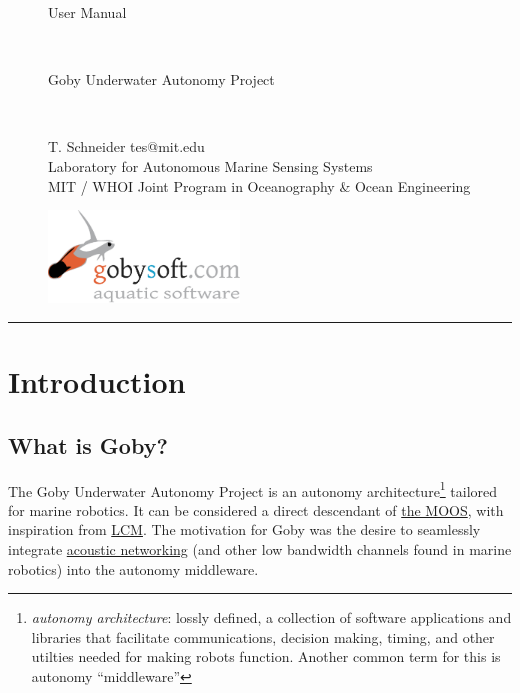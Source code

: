 \documentclass[11pt, letterpaper]{article}
\begin{document}
\begin{figure}[H]
\begin{minipage}[b]{0.55\linewidth}
\begin{LARGE}
User Manual
\end{LARGE}
\vspace{0.5em}\\
\begin{Large}
Goby Underwater Autonomy Project
\end{Large}
\vspace{0.5em}\\
\begin{footnotesize}
T. Schneider tes@mit.edu \\
Laboratory for Autonomous Marine Sensing Systems \\
MIT / WHOI Joint Program in Oceanography \& Ocean Engineering
\end{footnotesize}
\end{minipage}
\hfill
\begin{minipage}[b]{0.3\linewidth}
\begin{flushright}
\includegraphics[width=2in]{gobysoft_logo} 
\end{flushright}
\end{minipage}
\end{figure}

\vspace{0.5em}
\rule{\textwidth}{1pt}
\vspace{0.5em}

\tableofcontents

\section{Introduction}

\subsection{What is Goby?}

The Goby Underwater Autonomy Project is an autonomy architecture\footnote{\textit{autonomy architecture}: lossly defined, a collection of software applications and libraries that facilitate communications, decision making, timing, and other utilties needed for making robots function. Another common term for this is autonomy ``middleware''} tailored for marine robotics. It can be considered a direct descendant of \href{http://www.robots.ox.ac.uk/~mobile/MOOS/wiki/pmwiki.php}{the MOOS}, with inspiration from  \href{http://code.google.com/p/lcm/}{LCM}. The motivation for Goby was the desire to seamlessly integrate \href{http://gobysoft.com/doc/acomms.html}{acoustic networking} (and other low bandwidth channels found in marine robotics) into the autonomy middleware.
\end{document}
